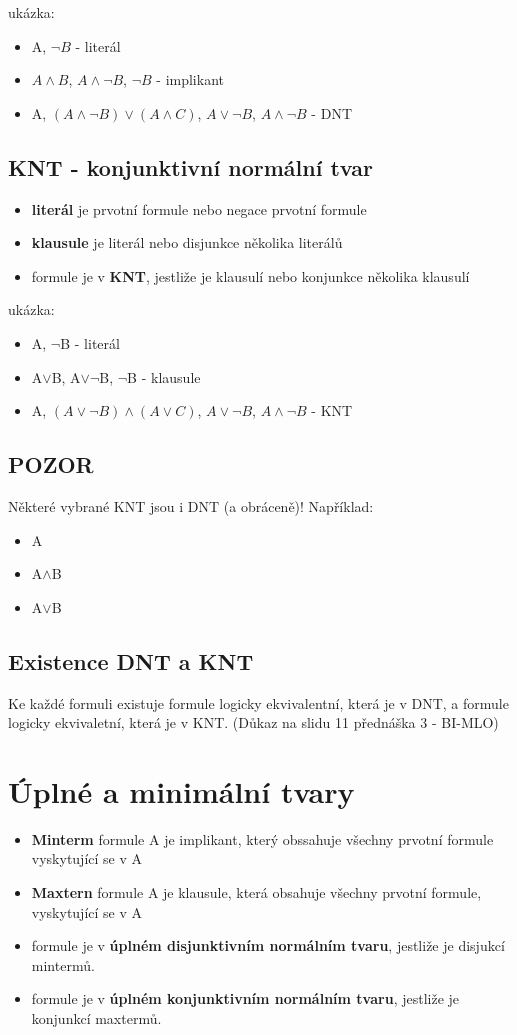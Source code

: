 \documentclass{szzclass}
\begin{document}
ukázka:
\begin{itemize}
	\item A, $\neg B$ - literál
	\item $A \wedge B$, $A \wedge \neg B$, $\neg B$ - implikant
	\item A, $(A \wedge \neg B) \vee (A \wedge C)$, $A \vee \neg B$, $A \wedge \neg B$ - DNT
\end{itemize}
\subsection{KNT - konjunktivní normální tvar}
\begin{itemize}
	\item \textbf{literál} je prvotní formule nebo negace prvotní formule
	\item \textbf{klausule} je literál nebo disjunkce několika literálů
	\item formule je v \textbf{KNT}, jestliže je klausulí nebo konjunkce několika klausulí 
\end{itemize}

ukázka:
\begin{itemize}
	\item A, $\neg$B - literál
	\item A$\vee$B, A$\vee$$\neg$B, $\neg$B - klausule
	\item A, $(A \vee \neg B) \wedge (A \vee C)$, $A \vee\neg B$, $A \wedge \neg B$ - KNT
\end{itemize}

\subsection{POZOR}
Některé vybrané KNT jsou i DNT (a obráceně)! Například:
\begin{itemize}
	\item A
	\item A$\wedge$B
	\item A$\vee$B
\end{itemize}
\subsection{Existence DNT a KNT}
Ke každé formuli existuje formule logicky ekvivalentní, která je v DNT, a formule logicky ekvivaletní, která je v KNT.
(Důkaz na slidu 11 přednáška 3 - BI-MLO)
\section{Úplné a minimální tvary}
\begin{itemize}
	\item \textbf{Minterm} formule A je implikant, který obssahuje všechny prvotní formule vyskytující se v A
	\item \textbf{Maxtern} formule A je klausule, která obsahuje všechny prvotní formule, vyskytující se v A
	\item formule je v \textbf{úplném disjunktivním normálním tvaru}, jestliže je disjukcí mintermů.
	\item formule je v \textbf{úplném konjunktivním normálním tvaru}, jestliže je konjunkcí maxtermů.
\end{itemize}
\end{document}
